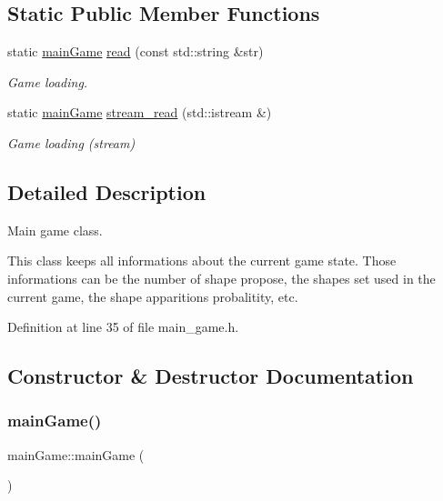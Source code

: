 \subsection*{Static Public Member Functions}
\begin{DoxyCompactItemize}
\item 
static \hyperlink{classmain_game}{main\+Game} \hyperlink{classmain_game_a51f19bcf307187637dffb26e58e1fc4c}{read} (const std\+::string \&str)
\begin{DoxyCompactList}\small\item\em Game loading. \end{DoxyCompactList}\item 
static \hyperlink{classmain_game}{main\+Game} \hyperlink{classmain_game_abfd0428b0caf9a180494db57fc4df7c3}{stream\+\_\+read} (std\+::istream \&)
\begin{DoxyCompactList}\small\item\em Game loading (stream) \end{DoxyCompactList}\end{DoxyCompactItemize}


\subsection{Detailed Description}
Main game class. 

This class keeps all informations about the current game state. Those informations can be the number of shape propose, the shape\textquotesingle{}s set used in the current game, the shape apparition\textquotesingle{}s probalitity, etc. 

Definition at line 35 of file main\+\_\+game.\+h.



\subsection{Constructor \& Destructor Documentation}
\hypertarget{classmain_game_ac016bd8f9474e58c5168b4c248877391}{}\label{classmain_game_ac016bd8f9474e58c5168b4c248877391} 
\subsubsection{\texorpdfstring{main\+Game()}{mainGame()}\hspace{0.1cm}{\footnotesize\ttfamily [1/2]}}
{\footnotesize\ttfamily main\+Game\+::main\+Game (\begin{DoxyParamCaption}{ }\end{DoxyParamCaption})}



